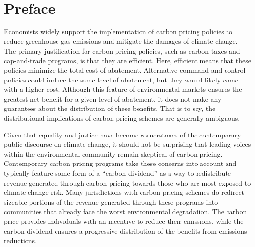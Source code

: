 ~

\newpage



\section*{Preface}

Economists widely support the implementation of carbon pricing policies to reduce greenhouse gas emissions and mitigate the damages of climate change. The primary justification for carbon pricing policies, such as carbon taxes and cap-and-trade programs, is that they are efficient. Here, efficient means that these policies minimize the total cost of abatement. Alternative command-and-control policies could induce the same level of abatement, but they would likely come with a higher cost. Although this feature of environmental markets ensures the greatest net benefit for a given level of abatement, it does not make any guarantees about the distribution of these benefits. That is to say, the distributional implications of carbon pricing schemes are generally ambiguous. 

Given that equality and justice have become cornerstones of the contemporary public discourse on climate change, it should not be surprising that leading voices within the environmental community remain skeptical of carbon pricing. Contemporary carbon pricing programs take these concerns into account and typically feature some form of a ``carbon dividend'' as a way to redistribute revenue generated through carbon pricing towards those who are most exposed to climate change risk. Many jurisdictions with carbon pricing schemes do redirect sizeable portions of the revenue generated through these programs into communities that already face the worst environmental degradation. The carbon price provides individuals with an incentive to reduce their emissions, while the carbon dividend ensures a progressive distribution of the benefits from emissions reductions. 

